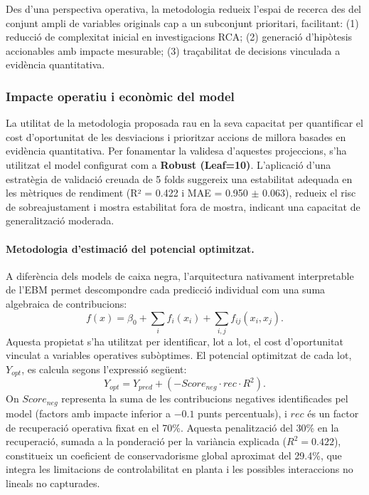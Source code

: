 Des d'una perspectiva operativa, la metodologia redueix l'espai de recerca des del conjunt ampli de variables originals cap a un subconjunt prioritari, facilitant: (1) reducció de complexitat inicial en investigacions RCA; (2) generació d'hipòtesis accionables amb impacte mesurable; (3) traçabilitat de decisions vinculada a evidència quantitativa.

\subsubsection{Impacte operatiu i econòmic del model}

La utilitat de la metodologia proposada rau en la seva capacitat per quantificar el cost d'oportunitat de les desviacions i prioritzar accions de millora basades en evidència quantitativa. Per fonamentar la validesa d'aquestes projeccions, s'ha utilitzat el model configurat com a \textbf{Robust (Leaf=10)}. L'aplicació d'una estratègia de validació creuada de 5 folds suggereix una estabilitat adequada en les mètriques de rendiment (R² = 0.422 i MAE = 0.950 $\pm$ 0.063), redueix el risc de sobreajustament i mostra estabilitat fora de mostra, indicant una capacitat de generalització moderada.

\paragraph{Metodologia d'estimació del potencial optimitzat.} A diferència dels models de caixa negra, l'arquitectura nativament interpretable de l'EBM permet descompondre cada predicció individual com una suma algebraica de contribucions:
\[
f(x) = \beta_0 + \sum_i f_i(x_i) + \sum_{i,j} f_{ij}(x_i,x_j).
\]
Aquesta propietat s'ha utilitzat per identificar, lot a lot, el cost d'oportunitat vinculat a variables operatives subòptimes. El potencial optimitzat de cada lot, $Y_{opt}$, es calcula segons l'expressió següent:
\[
Y_{opt} = Y_{pred} + \left(-Score_{neg} \cdot rec \cdot R^2\right).
\]
On $Score_{neg}$ representa la suma de les contribucions negatives identificades pel model (factors amb impacte inferior a $-0.1$ punts percentuals), i $rec$ és un factor de recuperació operativa fixat en el 70\%. Aquesta penalització del 30\% en la recuperació, sumada a la ponderació per la variància explicada ($R^2=0.422$), constitueix un coeficient de conservadorisme global aproximat del 29.4\%, que integra les limitacions de controlabilitat en planta i les possibles interaccions no lineals no capturades.

